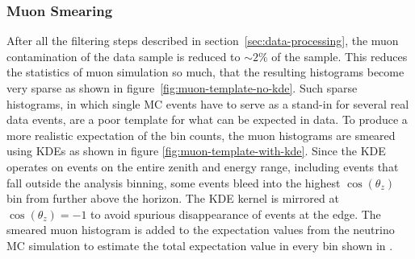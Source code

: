 \subsubsection{Muon Smearing}
\label{section:muon_kde}

After all the filtering steps described in section~\ref{sec:data-processing}, the muon contamination of the data sample is reduced to $\sim 2\%$ of the sample.
This reduces the statistics of muon simulation so much, that the resulting histograms become very sparse as shown in figure~\ref{fig:muon-template-no-kde}.
Such sparse histograms, in which single MC events have to serve as a stand-in for several real data events, are a poor template for what can be expected in data.
To produce a more realistic expectation of the bin counts, the muon histograms are smeared using KDEs as shown in figure \ref{fig:muon-template-with-kde}.
Since the KDE operates on events on the entire zenith and energy range, including events that fall outside the analysis binning, some events bleed into the highest $\cos(\theta_z)$ bin from further above the horizon.
The KDE kernel is mirrored at $\cos(\theta_z) = -1$ to avoid spurious disappearance of events at the edge.
The smeared muon histogram is added to the expectation values from the neutrino MC simulation to estimate the total expectation value in every bin shown in .

